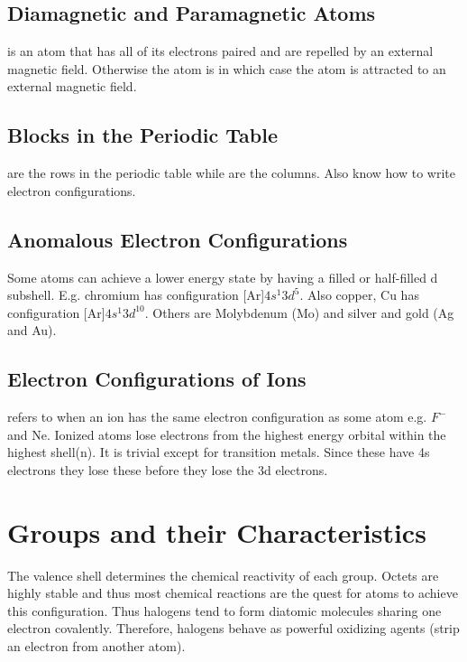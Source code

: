 \documentclass[../GChemReview.tex]{subfiles}
\begin{document}
  \subsection{Diamagnetic and Paramagnetic Atoms}

   is an atom that has all of its electrons paired and are
  repelled by an external magnetic field. Otherwise the atom is
   in which case the atom is attracted to an external
  magnetic field.

  \subsection{Blocks in the Periodic Table}

   are the rows in the periodic table while  are the
  columns. Also know how to write electron configurations.

  \subsection{Anomalous Electron Configurations}

  Some atoms can achieve a lower energy state by having a filled or half-filled
  d subshell. E.g. chromium has configuration [Ar]$ 4s^{1}3d^{5} $. Also copper,
  Cu has configuration [Ar]$ 4s^{1}3d^{10} $. Others are Molybdenum (Mo) and
  silver and gold (Ag and Au).

  \subsection{Electron Configurations of Ions}

   refers to when an ion has the same electron
  configuration as some atom e.g. $ F^{-} $ and Ne. Ionized atoms lose electrons
  from the highest energy orbital within the highest shell(n). It is trivial
  except for transition metals. Since these have 4s electrons they lose these
  before they lose the 3d electrons. 

  \section{Groups and their Characteristics}

  The valence shell determines the chemical reactivity of each group. Octets are
  highly stable and thus most chemical reactions are the quest for atoms to
  achieve this configuration. Thus halogens tend to form diatomic molecules
  sharing one electron covalently. Therefore, halogens behave as powerful
  oxidizing agents (strip an electron from another atom).
\end{document}
